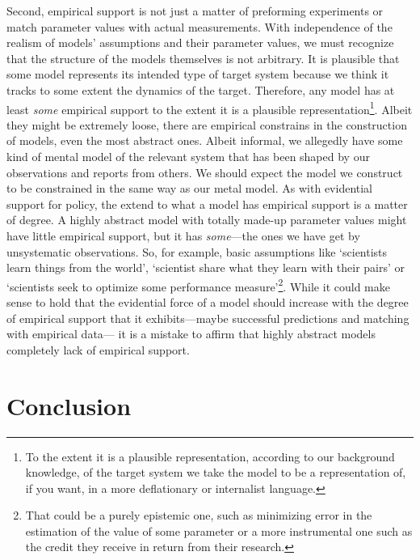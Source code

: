 \documentclass{article}
\begin{document}
Second, empirical support is not just a matter of preforming experiments or match parameter values with actual measurements. With independence of the realism of models' assumptions and their parameter values, we must recognize that the structure of the models themselves is not arbitrary. It is plausible that some model represents its intended type of target system because we think it tracks to some extent the dynamics of the target. Therefore, any model has at least \textit{some} empirical support to the extent it is a plausible representation\footnote{To the extent it is a plausible representation, according to our background knowledge, of the target system we take the model to be a representation of, if you want, in a more deflationary or internalist language.}. Albeit they might be extremely loose, there are empirical constrains in the construction of models, even the most abstract ones. Albeit informal, we allegedly have some kind of mental model of the relevant system that has been shaped by our observations and reports from others. We should expect the model we construct to be constrained in the same way as our metal model. As with evidential support for policy, the extend to what a model has empirical support is a matter of degree. A highly abstract model with totally made-up parameter values might have little empirical support, but it has \textit{some}—the ones we have get by unsystematic observations. So, for example, basic assumptions like `scientists learn things from the world', `scientist share what they learn with their pairs' or `scientists seek to optimize some performance measure'\footnote{That could be a purely epistemic one, such as minimizing error in the estimation of the value of some parameter or a more instrumental one such as the credit they receive in return from their research.}.  While it could make sense to hold that the evidential force of a model should increase with the degree of empirical support that it exhibits—maybe successful predictions and matching with empirical data— it is a mistake to affirm that highly abstract models completely lack of empirical support.

\section{Conclusion}
\end{document}
